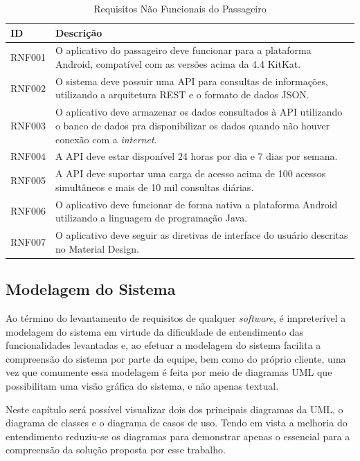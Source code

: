 {{{{\renewcommand{\arraystretch}{2}
\begin{table}[H]
\centering
\caption{Requisitos Não Funcionais do Passageiro}
\label{tab:passageiro-requisitos-nao-funcionais}
\begin{tabular}{ l | p{13.5cm} }
\hline
\textbf{ID} & \textbf{Descrição} \\
\hline
RNF001 & O aplicativo do passageiro deve funcionar para a plataforma Android, compatível com as versões acima da 4.4 KitKat. \\ \hline
RNF002 & O sistema deve possuir uma API para consultas de informações, utilizando a arquitetura REST e o formato de dados JSON. \\ \hline
RNF003 & O aplicativo deve armazenar os dados consultados à API utilizando o banco de dados pra disponibilizar os dados quando não houver conexão com a \textit{internet}. \\ \hline
RNF004 & A API deve estar disponível 24 horas por dia e 7 dias por semana. \\ \hline
RNF005 & A API deve suportar uma carga de acesso acima de 100 acessos simultâneos e mais de 10 mil consultas diárias. \\ \hline
RNF006 & O aplicativo deve funcionar de forma nativa a plataforma Android utilizando a linguagem de programação Java. \\ \hline
RNF007 & O aplicativo deve seguir as diretivas de interface do usuário descritas no Material Design\footnotemark. \\ \hline
\end{tabular}
\end{table}


\subsection{Modelagem do Sistema}

Ao término do levantamento de requisitos de qualquer \textit{software}, é impreterível a modelagem do sistema em virtude da dificuldade de entendimento das funcionalidades levantadas e, ao efetuar a modelagem do sistema facilita a compreensão do sistema por parte da equipe, bem como do próprio cliente, uma vez que comumente essa modelagem é feita por meio de diagramas UML que possibilitam uma visão gráfica do sistema, e não apenas textual.

Neste capítulo será possível visualizar dois dos principais diagramas da UML, o diagrama de classes e o diagrama de casos de uso. Tendo em vista a melhoria do entendimento reduziu-se os diagramas para demonstrar apenas o essencial para a compreensão da solução proposta por esse trabalho.

}}}}
